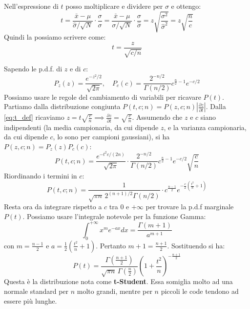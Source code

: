 \documentclass[openany,a4paper,12pt]{book}
\theoremstyle{remark}
\begin{document}
Nell'espressione di $t$ posso moltiplicare e dividere per $\sigma$ e ottengo:
$$ t = \frac{\bar{x}-\mu}{\hat{\sigma}/\sqrt{N}} \cdot \frac{\sigma}{\sigma} = \frac{\bar{x}-\mu}{\sigma/\sqrt{N}} \cdot \frac{\sigma}{\hat{\sigma}} = z \sqrt{\frac{\sigma^2}{\hat{\sigma}^2}} = z \sqrt{\frac{n}{c}} $$
Quindi la possiamo scrivere come:
\begin{equation}
    t = \frac{z}{\sqrt{c/n}} \label{eq:t_def}
\end{equation}

Sapendo le p.d.f. di $z$ e di $c$:
$$ P_z(z) = \frac{e^{-z^2/2}}{\sqrt{2\pi}}, \quad P_c(c) = \frac{2^{-n/2}}{\Gamma(n/2)} c^{\frac{n}{2}-1} e^{-c/2} $$
Possiamo usare le regole del cambiamento di variabili per ricavare $P(t)$. Partiamo dalla distribuzione congiunta $P(t,c; n) = P(z,c;n) \left| \frac{\partial z}{\partial t} \right|$. Dalla \eqref{eq:t_def} ricaviamo $z = t\sqrt{\frac{c}{n}} \implies \frac{\partial z}{\partial t} = \sqrt{\frac{c}{n}}$.
Assumendo che $z$ e $c$ siano indipendenti (la media campionaria, da cui dipende $z$, e la varianza campionaria, da cui dipende $c$, lo sono per campioni gaussiani), si ha $P(z,c;n) = P_z(z)P_c(c)$:
$$ P(t,c;n) = \frac{e^{-t^2 c / (2n)}}{\sqrt{2\pi}} \cdot \frac{2^{-n/2}}{\Gamma(n/2)} c^{\frac{n}{2}-1} e^{-c/2} \sqrt{\frac{c}{n}} $$
Riordinando i termini in $c$:
$$ P(t,c;n) = \frac{1}{\sqrt{\pi n} \, 2^{(n+1)/2} \Gamma(n/2)} \cdot c^{\frac{n-1}{2}} e^{-\frac{c}{2} \left( \frac{t^2}{n} + 1 \right)} $$
Resta ora da integrare rispetto a $c$ tra $0$ e $+\infty$ per trovare la p.d.f marginale $P(t)$. Possiamo usare l'integrale notevole per la funzione Gamma:
$$ \int_0^{+\infty} x^m e^{-ax} dx = \frac{\Gamma(m+1)}{a^{m+1}} $$
con $m = \frac{n-1}{2}$ e $a = \frac{1}{2} \left( \frac{t^2}{n} + 1 \right)$. Pertanto $m+1 = \frac{n+1}{2}$.
Sostituendo si ha:
\begin{equation}
    P(t) = \frac{\Gamma\left(\frac{n+1}{2}\right)}{\sqrt{\pi n} \, \Gamma\left(\frac{n}{2}\right)} \left( 1 + \frac{t^2}{n} \right)^{-\frac{n+1}{2}}
\end{equation}
Questa è la distribuzione nota come \textbf{t-Student}. Essa somiglia molto ad una normale standard per $n$ molto grandi, mentre per $n$ piccoli le code tendono ad essere più lunghe.

\begin{center}
\end{center}
\end{document}

